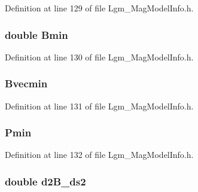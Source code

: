 Definition at line 129 of file Lgm\_\-MagModelInfo.h.\hypertarget{struct_lgm___mag_model_info_2ac3a99381d281d4caabf024a33f0b31}{
\subsubsection[{Bmin}]{\setlength{\rightskip}{0pt plus 5cm}double {\bf Bmin}}}
\label{struct_lgm___mag_model_info_2ac3a99381d281d4caabf024a33f0b31}




Definition at line 130 of file Lgm\_\-MagModelInfo.h.\hypertarget{struct_lgm___mag_model_info_2331552c154915274f41a4113148557b}{
\subsubsection[{Bvecmin}]{ {\bf Bvecmin}}}
\label{struct_lgm___mag_model_info_2331552c154915274f41a4113148557b}




Definition at line 131 of file Lgm\_\-MagModelInfo.h.\hypertarget{struct_lgm___mag_model_info_5bafc8f6aad6cc63366225b1a7c42901}{
\subsubsection[{Pmin}]{ {\bf Pmin}}}
\label{struct_lgm___mag_model_info_5bafc8f6aad6cc63366225b1a7c42901}




Definition at line 132 of file Lgm\_\-MagModelInfo.h.\hypertarget{struct_lgm___mag_model_info_4cfe25e04c92794254faa1a0abb4d817}{
\subsubsection[{d2B\_\-ds2}]{\setlength{\rightskip}{0pt plus 5cm}double {\bf d2B\_\-ds2}}}
\label{struct_lgm___mag_model_info_4cfe25e04c92794254faa1a0abb4d817}




